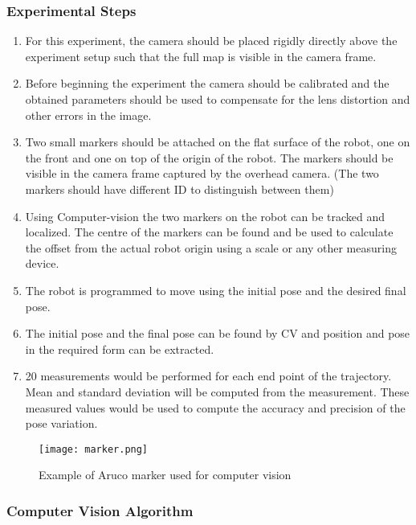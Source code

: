 \documentclass[10pt,a4paper]{article}
\begin{document}
	\subsubsection{Experimental Steps}
	
\begin{enumerate}
	\item
	For this experiment, the camera should be placed rigidly directly above the experiment setup such that the full map is visible in the camera frame. 
	\item
	Before beginning the experiment the camera should be calibrated and the obtained parameters should be used to compensate for the lens distortion and other errors in the image. 
	\item
	Two small markers should be attached on the flat surface of the robot, one on the front and one on top of the origin of the robot. The markers should be visible in the camera frame captured by the overhead camera. (The two markers should have different ID to distinguish between them)
	\item
    Using Computer-vision the two markers on the robot can be tracked and localized. The centre of the markers can be found and be used to calculate the offset from the actual robot origin using a scale or any other measuring device.
	\item
	The robot is programmed to move using the initial pose and the desired final pose.
	\item
	The initial pose and the final pose can be found by CV and position and pose in the required form can be extracted.
	\item
	20 measurements would be performed for each end point of the trajectory. Mean and standard deviation will be computed from the measurement. These measured values would be used to compute the accuracy and precision of the pose variation. 
	
\end{enumerate}

\vspace{0.5cm}

\begin{figure}[h]
	\centering
	\texttt{[image: marker.png]}
	\caption{ Example of Aruco marker used for computer vision}
\end{figure}


\subsubsection{Computer Vision Algorithm}
\end{document}

